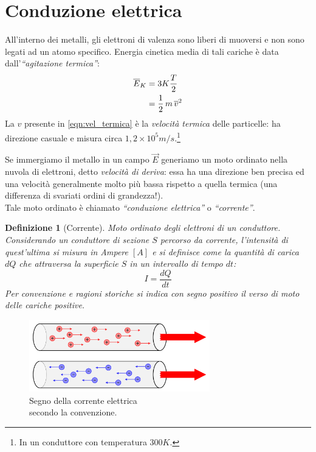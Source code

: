 \documentclass[a4paper,12pt,titlepage,openany]{book}
\theoremstyle{mydef}
\newtheorem{definizione}{Definizione}[chapter]
\begin{document}
        \section{Conduzione elettrica}
            All'interno dei metalli, gli elettroni di valenza sono liberi di muoversi e non sono legati ad un atomo
            specifico. Energia cinetica media di tali cariche è data dall'\emph{``agitazione termica''}:
            \begin{align}
                \overline{E}_K &= 3K\frac{T}{2} \notag \\
                &= \frac{1}{2}\,m\,\overline{v}^2 \label{eqn:vel_termica}
            \end{align}
            La $v$ presente in \ref{eqn:vel_termica} è la \emph{velocità termica} delle particelle: ha direzione casuale
            e misura circa $1,2\times 10^5 m/s$.\footnote{In un conduttore con temperatura $300K$.}
            
            Se immergiamo il metallo in un campo $\vec{E}$ generiamo un moto ordinato nella nuvola di elettroni,
            detto \emph{velocità di deriva}: essa ha una direzione ben precisa ed una velocità generalmente molto
            più bassa rispetto a quella termica (una differenza di svariati ordini di grandezza!).\\
            Tale moto ordinato è chiamato \emph{``conduzione elettrica''} o \emph{``corrente''}.
            
            \begin{definizione}[Corrente]
                Moto ordinato degli elettroni di un conduttore. Considerando un conduttore di sezione $S$ percorso da
                corrente, l'intensità di quest'ultima si misura in \emph{Ampere} $[A]$ e si definisce come la quantità
                di carica $dQ$ che attraversa la superficie $S$ in un intervallo di tempo $dt$:
                \begin{equation}
                    \boxed{I = \frac{dQ}{dt}}
                \end{equation}
                Per convenzione e ragioni storiche si indica con segno positivo il verso di moto delle cariche positive.
            \end{definizione}
            
            \begin{figure}
                \centering
                \includegraphics[width=0.7\textwidth]{corrente_elettrica}
                \captionsetup{format=plain, justification=raggedright,labelsep=newline}
                \caption{Segno della corrente elettrica\\ secondo la convenzione.}
            \end{figure}
            
\end{document}
